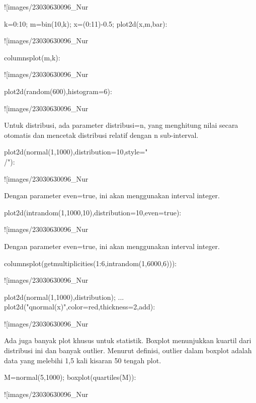 \documentclass{article}
\begin{document}
![images/23030630096_Nur%

\>k=0:10; m=bin(10,k); x=(0:11)-0.5; plot2d(x,m,\>bar):


![images/23030630096_Nur%

\>columnsplot(m,k):


![images/23030630096_Nur%

\>plot2d(random(600),histogram=6):


![images/23030630096_Nur%

Untuk distribusi, ada parameter distribusi=n, yang menghitung nilai
secara otomatis dan mencetak distribusi relatif dengan n sub-interval.


\>plot2d(normal(1,1000),distribution=10,style="\\/"):


![images/23030630096_Nur%

Dengan parameter even=true, ini akan menggunakan interval integer.


\>plot2d(intrandom(1,1000,10),distribution=10,even=true):


![images/23030630096_Nur%

Dengan parameter even=true, ini akan menggunakan interval integer.


\>columnsplot(getmultiplicities(1:6,intrandom(1,6000,6))):


![images/23030630096_Nur%

\>plot2d(normal(1,1000),\>distribution); ...  
\>     plot2d("qnormal(x)",color=red,thickness=2,\>add):


![images/23030630096_Nur%

Ada juga banyak plot khusus untuk statistik. Boxplot menunjukkan
kuartil dari distribusi ini dan banyak outlier. Menurut definisi,
outlier dalam boxplot adalah data yang melebihi 1,5 kali kisaran 50%
tengah plot.


\>M=normal(5,1000); boxplot(quartiles(M)):


![images/23030630096_Nur%
\end{document}
